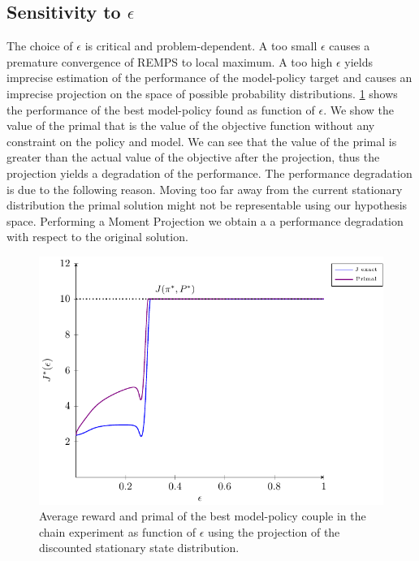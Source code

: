 \subsection{Sensitivity to $\epsilon$}
The choice of $\epsilon$ is critical and problem-dependent. A too small $\epsilon$ causes a premature convergence of REMPS to local maximum. A too high $\epsilon$ yields imprecise estimation of the performance of the model-policy target and causes an imprecise projection on the space of possible probability distributions. \cref{fig:jeps} shows the performance of the best model-policy found as function of $\epsilon$. 
We show the value of the primal that is the value of the objective function without any constraint on the policy and model. We can see that the value of the primal is greater than the actual value of the objective after the projection, thus the projection yields a degradation of the performance. The performance degradation is due to the following reason. Moving too far away from the current stationary distribution the primal solution might not be representable using our hypothesis space. Performing a Moment Projection we obtain a  a performance degradation with respect to the original solution.
\begin{figure}[!tb]
\centering
	\includegraphics[width=1\textwidth]{plots/chain/plot_j_epsilon}
	\caption{Average reward and primal of the best model-policy couple in the chain experiment as function of $\epsilon$ using the projection of the discounted stationary state distribution.}
	\label{fig:jeps}
\end{figure}

